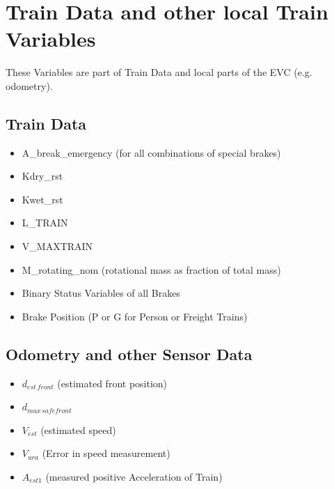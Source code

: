 \documentclass{template/openetcs_article}
\begin{document}
\section{Train Data and other local Train Variables}

These Variables are part of Train Data and local parts of the EVC (e.g. odometry).

\subsection{Train Data}
\begin{itemize}
\item A\_break\_emergency (for all combinations of special brakes)
\item Kdry\_rst
\item Kwet\_rst
\item L\_TRAIN
\item V\_MAXTRAIN
\item M\_rotating\_nom (rotational mass as fraction of total mass)
\item Binary Status Variables of all Brakes
\item Brake Position (P or G for Person or Freight Trains)
\end{itemize}

\subsection{Odometry and other Sensor Data}
\begin{itemize}
\item $d_{est\,front}$ (estimated front position)
\item $d_{max\,safefront}$
\item $V_{est}$ (estimated speed)
\item $V_{ura}$ (Error in speed measurement)
\item $A_{est1}$ (measured positive Acceleration of Train)

\end{itemize}


%



\end{document}
